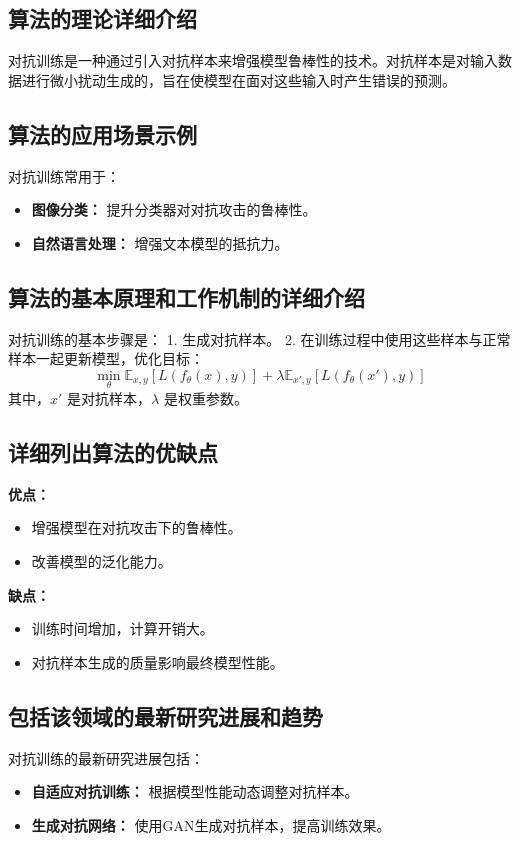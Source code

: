 \subsection*{算法的理论详细介绍}
对抗训练是一种通过引入对抗样本来增强模型鲁棒性的技术。对抗样本是对输入数据进行微小扰动生成的，旨在使模型在面对这些输入时产生错误的预测。

\subsection*{算法的应用场景示例}
对抗训练常用于：
\begin{itemize}
    \item \textbf{图像分类：} 提升分类器对对抗攻击的鲁棒性。
    \item \textbf{自然语言处理：} 增强文本模型的抵抗力。
\end{itemize}

\subsection*{算法的基本原理和工作机制的详细介绍}
对抗训练的基本步骤是：
1. 生成对抗样本。
2. 在训练过程中使用这些样本与正常样本一起更新模型，优化目标：
\[
    \min_{\theta} \mathbb{E}_{x,y}[L(f_{\theta}(x), y)] + \lambda \mathbb{E}_{x',y}[L(f_{\theta}(x'), y)]
\]
其中，\(x'\) 是对抗样本，\(\lambda\) 是权重参数。

\subsection*{详细列出算法的优缺点}
\textbf{优点：}
\begin{itemize}
    \item 增强模型在对抗攻击下的鲁棒性。
    \item 改善模型的泛化能力。
\end{itemize}

\textbf{缺点：}
\begin{itemize}
    \item 训练时间增加，计算开销大。
    \item 对抗样本生成的质量影响最终模型性能。
\end{itemize}

\subsection*{包括该领域的最新研究进展和趋势}
对抗训练的最新研究进展包括：
\begin{itemize}
    \item \textbf{自适应对抗训练：} 根据模型性能动态调整对抗样本。
    \item \textbf{生成对抗网络：} 使用GAN生成对抗样本，提高训练效果。
\end{itemize}

